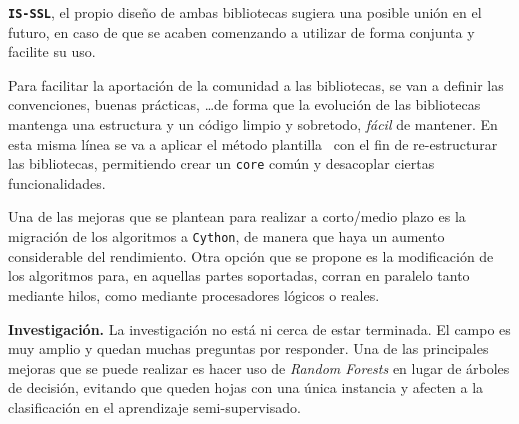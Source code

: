 \textbf{\texttt{IS-SSL}}, el propio diseño de ambas bibliotecas sugiera una posible unión en el futuro, en caso de que se acaben comenzando a utilizar de forma conjunta y facilite su uso. 

Para facilitar la aportación de la comunidad a las bibliotecas, se van a definir las convenciones, buenas prácticas, \ldots de forma que la evolución de las bibliotecas mantenga una estructura y un código limpio y sobretodo, \emph{fácil} de mantener. En esta misma línea se va a aplicar el método plantilla~\cite{shvets2021} con el fin de re-estructurar las bibliotecas, permitiendo crear un \texttt{core} común y desacoplar ciertas funcionalidades.

Una de las mejoras que se plantean para realizar a corto/medio plazo es la migración de los algoritmos a \texttt{Cython}, de manera que haya un aumento considerable del rendimiento. Otra opción que se propone es la modificación de los algoritmos para, en aquellas partes soportadas, corran en paralelo tanto mediante hilos, como mediante procesadores lógicos o reales.

\textbf{Investigación.} La investigación no está ni cerca de estar terminada. El campo es muy amplio y quedan muchas preguntas por responder. Una de las principales mejoras que se puede realizar es hacer uso de \textit{Random Forests} en lugar de árboles de decisión, evitando que queden hojas con una única instancia y afecten a la clasificación en el aprendizaje semi-supervisado.

